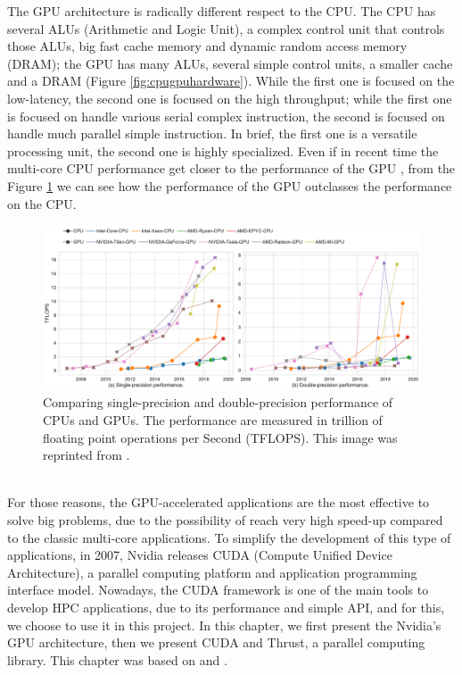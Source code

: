 The GPU architecture is radically different respect to the CPU. The CPU has several ALUs (Arithmetic and Logic Unit), a complex control unit that controls those ALUs, big fast cache memory and dynamic random access memory (DRAM); the GPU has many ALUs, several simple control units, a smaller cache and a DRAM (Figure \ref{fig:cpugpuhardware}). While the first one is focused on the low-latency, the second one is focused on the high throughput;
while the first one is focused on handle various serial complex instruction, the second is focused on handle much parallel simple instruction.
In brief, the first one is a versatile processing unit, the second one is highly specialized.
Even if in recent time the multi-core CPU performance get closer to the performance of the GPU \cite{gpucpu}, from the Figure \ref{fig:cpugpu} we can see how the performance of the GPU outclasses the performance on the CPU.\\
\begin{figure}[h]
	\centering
	\includegraphics[width=1.\linewidth]{0-resources/cpu_gpu}
	\caption{Comparing single-precision and double-precision performance of CPUs and GPUs. The performance are measured in trillion of floating point operations per Second (TFLOPS). This image was reprinted from \cite{gpucpu}.}
	\label{fig:cpugpu}
\end{figure} 
\\	
For those reasons, the GPU-accelerated applications are the most effective to solve big problems, due to the possibility of reach very high speed-up compared to the classic multi-core applications. 
To simplify the development of this type of applications, in 2007, Nvidia releases CUDA (Compute Unified Device Architecture), a parallel computing platform and application programming interface model.
Nowadays, the CUDA framework is one of the main tools to develop HPC applications, due to its performance and simple API, and for this, we choose to use it in this project.
In this chapter, we first present the Nvidia's GPU architecture, then we present CUDA and Thrust, a parallel computing library. This chapter was based on \cite{turing} and \cite{cuda_manual}.
